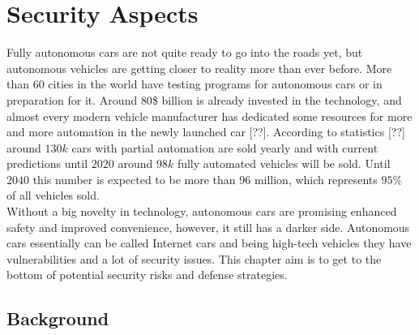 \chapter{Security Aspects}
\label{chap:5}
%
Fully autonomous cars are not quite ready to go into the roads yet, but autonomous vehicles are getting closer to reality more than ever before. More than $60$ cities in the world have testing programs for autonomous cars or in preparation for it. Around $80$\$ billion is already invested in the technology, and almost every modern vehicle manufacturer has dedicated some resources for more and more automation in the newly launched car [??].  According to statistics [??] around $130k$ cars with partial automation are sold yearly and with current predictions until $2020$ around $98k$ fully automated vehicles will be sold. Until $2040$ this number is expected to be more than $96$ million, which represents $95$\% of all vehicles sold. \\
Without a big novelty in technology, autonomous cars are promising enhanced safety and improved convenience, however, it still has a darker side. Autonomous cars essentially can be called Internet cars and being high-tech vehicles they have vulnerabilities and a lot of security issues. This chapter aim is to get to the bottom of potential security risks and defense strategies.

\section{Background}

